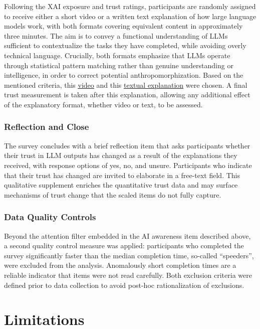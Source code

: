 Following the XAI exposure and trust ratings, participants are randomly assigned to receive either a short video or a written text explanation of how large language models work, with both formats covering equivalent content in approximately three minutes. The aim is to convey a functional understanding of LLMs sufficient to contextualize the tasks they have completed, while avoiding overly technical language. Crucially, both formats emphasize that LLMs operate through statistical pattern matching rather than genuine understanding or intelligence, in order to correct potential anthropomorphization. Based on the mentioned criteria, this \href{https://www.youtube.com/watch?v=8Rumn1O-RkY}{\underline{video}} and this \href{https://axels-technikblog.de/was-ist-ein-llm-large-language-models-einfach-erklaert/}{\underline{textual explanation}} were chosen.
A final trust measurement is taken after this explanation, allowing any additional effect of the explanatory format, whether video or text, to be assessed.

\subsubsection{Reflection and Close}

The survey concludes with a brief reflection item that asks participants whether their trust in LLM outputs has changed as a result of the explanations they received, with response options of yes, no, and unsure. Participants who indicate that their trust has changed are invited to elaborate in a free-text field. This qualitative supplement enriches the quantitative trust data and may surface mechanisms of trust change that the scaled items do not fully capture.

\subsubsection{Data Quality Controls}

Beyond the attention filter embedded in the AI awareness item described above, a second quality control measure was applied: participants who completed the survey significantly faster than the median completion time, so-called ``speeders'', were excluded from the analysis. Anomalously short completion times are a reliable indicator that items were not read carefully. Both exclusion criteria were defined prior to data collection to avoid post-hoc rationalization of exclusions.

\section{Limitations}
\label{sec:limitations}

